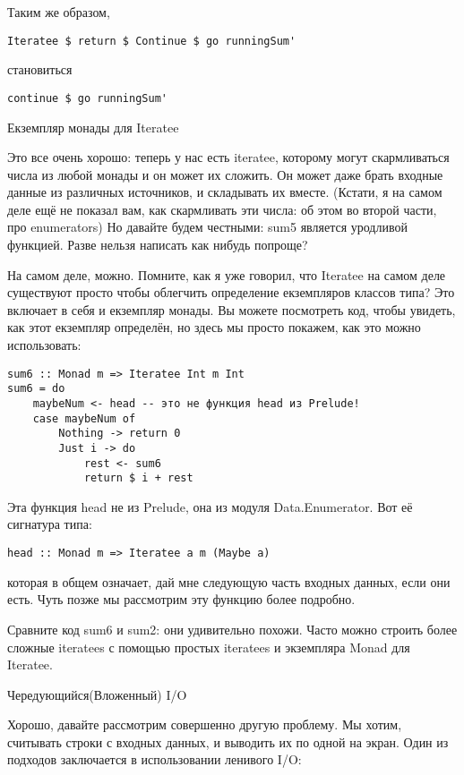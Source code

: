 Таким же образом,

\begin{lstlisting}
Iteratee $ return $ Continue $ go runningSum'
\end{lstlisting}

становиться

\begin{lstlisting}
continue $ go runningSum'
\end{lstlisting}

Екземпляр монады для Iteratee

Это все очень хорошо: теперь у нас есть iteratee, которому могут скармливаться числа из любой монады и он может их сложить. Он может даже брать входные данные из различных источников, и складывать их вместе. (Кстати, я на самом деле ещё не показал вам, как скармливать эти числа: об этом во второй части, про enumerators) Но давайте будем честными: sum5 является уродливой функцией. Разве нельзя написать как нибудь попроще?

На самом деле, можно. Помните, как я уже говорил, что Iteratee на самом деле существуют просто чтобы облегчить определение екземпляров классов типа? Это включает в себя и екземпляр монады. Вы можете посмотреть код, чтобы увидеть, как этот екземпляр определён, но здесь мы просто покажем, как это можно использовать:

\begin{lstlisting}
sum6 :: Monad m => Iteratee Int m Int
sum6 = do
    maybeNum <- head -- это не функция head из Prelude!
    case maybeNum of
        Nothing -> return 0
        Just i -> do
            rest <- sum6
            return $ i + rest
\end{lstlisting}

Эта функция head не из Prelude, она из модуля Data.Enumerator. Вот её сигнатура типа:

\begin{lstlisting}
head :: Monad m => Iteratee a m (Maybe a)
\end{lstlisting}

которая в общем означает, дай мне следующую часть входных данных, если они есть. Чуть позже мы рассмотрим эту функцию более подробно.

Сравните код sum6 и sum2: они удивительно похожи. Часто можно строить более сложные iteratees с помощью простых iteratees и экземпляра Monad для Iteratee.

Чередующийся(Вложенный) I/O

Хорошо, давайте рассмотрим совершенно другую проблему. Мы хотим, считывать строки с входных данных, и выводить их по одной на экран. Один из подходов заключается в использовании ленивого I/O:

